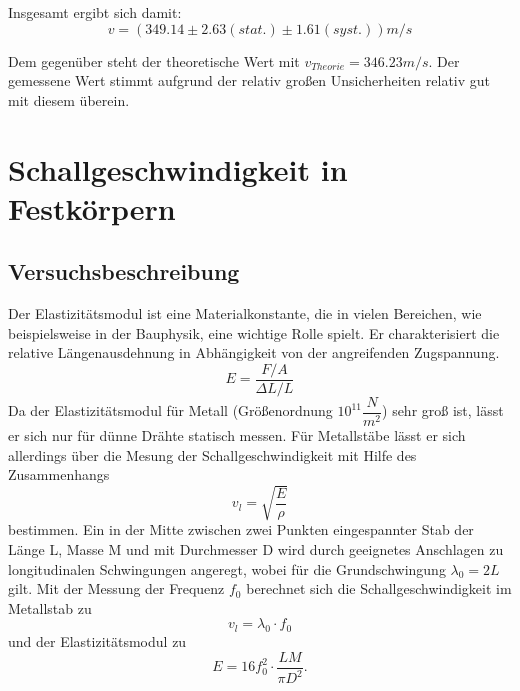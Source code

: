 \documentclass[12pt,a4paper]{article}
\begin{document}
Insgesamt ergibt sich damit:
\begin{equation}
v=(349.14 \pm 2.63(stat.) \pm 1.61(syst.))m/s
\end{equation}

Dem gegenüber steht der theoretische Wert mit $v_{Theorie}=346.23m/s$. Der gemessene Wert stimmt aufgrund der relativ großen Unsicherheiten relativ gut mit diesem überein.















\section{Schallgeschwindigkeit in Festkörpern}
\subsection{Versuchsbeschreibung}
Der Elastizitätsmodul ist eine Materialkonstante, die in vielen Bereichen, wie beispielsweise in der Bauphysik, eine wichtige Rolle spielt. Er charakterisiert die relative Längenausdehnung in Abhängigkeit von der angreifenden Zugspannung.
\begin{equation}
E = \dfrac{F/A}{\Delta L/L}
\end{equation}
Da der Elastizitätsmodul für Metall (Größenordnung $10^{11} \dfrac{N}{m^2}$) sehr groß ist, lässt er sich nur für dünne Drähte statisch messen. Für Metallstäbe lässt er sich allerdings über die Mesung der Schallgeschwindigkeit mit Hilfe des Zusammenhangs 
\begin{equation}
v_l = \sqrt{\dfrac{E}{\rho}}
\label{eq:001}
\end{equation}
bestimmen. Ein in der Mitte zwischen zwei Punkten eingespannter Stab der Länge L, Masse M und mit Durchmesser D wird durch geeignetes Anschlagen zu longitudinalen Schwingungen angeregt, wobei für die Grundschwingung $\lambda_0 = 2L$ gilt. Mit der Messung der Frequenz $f_0$ berechnet sich die Schallgeschwindigkeit im Metallstab zu
\begin{equation}
v_l = \lambda_0 \cdot f_0
\label{eq:002}
\end{equation}
und der Elastizitätsmodul zu
\begin{equation}
E = 16 f_0^2 \cdot \dfrac{L M}{\pi D^2}.
\label{eq:003}
\end{equation}
\end{document}

